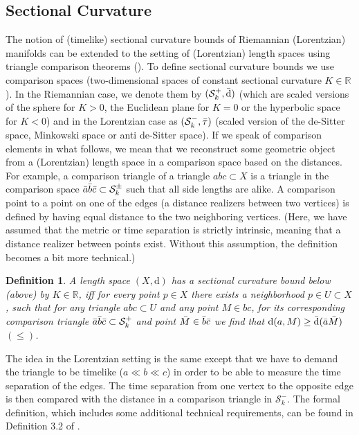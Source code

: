 \documentclass[11pt, a4paper]{article} %
\newcommand{\R}{\mathbb{R}} %
\newcommand{\dd}{\text{d}} %
\newtheorem{definition}{Definition}[section]
\theoremstyle{plain} %
\begin{document}
\subsection{Sectional Curvature}
The notion of (timelike) sectional curvature bounds of Riemannian (Lorentzian) manifolds can be extended to the setting of (Lorentzian) length spaces using triangle comparison theorems \cite{Burago2001} (\cite{beran2023curvature}). 
To define sectional curvature bounds we use comparison spaces (two-dimensional spaces of constant sectional curvature $K\in \R$). In the Riemannian case, we denote them by $(\mathcal{S}^+_k,\Bar{\dd})$ (which are scaled versions of the sphere for $K>0$, the Euclidean plane for $K=0$ or the hyperbolic space for $K<0$) and in the Lorentzian case as $(\mathcal{S}^-_k,\Bar{\tau})$ (scaled version of the de-Sitter space, Minkowski space or anti de-Sitter space).
If we speak of comparison elements in what follows, we mean that we reconstruct some geometric object from a (Lorentzian) length space in a comparison space based on the distances. For example, a comparison triangle of a triangle $abc \subset X$ is a triangle in the comparison space $\Bar{a}\Bar{b}\Bar{c}\subset \mathcal{S}^\pm_k$ such that all side lengths are alike. A comparison point to a point on one of the edges (a distance realizers between two vertices) is defined by having equal distance to the two neighboring vertices. (Here, we have assumed that the metric or time separation is strictly intrinsic, meaning that a distance realizer between points exist. Without this assumption, the definition becomes a bit more technical.)
\begin{definition}
A length space $(X,\dd)$ has a sectional curvature bound below (above) by $K\in\R$, iff for every point $p\in X$ there exists a neighborhood $p \in U \subset X$, such that for any triangle $abc \subset U$ and any point $M \in bc$, for its corresponding comparison triangle $\Bar{a}\Bar{b}\Bar{c}\subset \mathcal{S}^+_k$ and point $\Bar{M}\in \Bar{b}\Bar{c}$ we find that $\dd(a,M) \geq \Bar{\dd}(\Bar{a}\Bar{M})$ $(\leq)$.
\end{definition}
The idea in the Lorentzian setting is the same except that we have to demand the triangle to be timelike ($a\ll b\ll c$) in order to be able to measure the time separation of the edges. The time separation from one vertex to the opposite edge is then compared with the distance in a comparison triangle in $\mathcal{S}^-_k$. The formal definition, which includes some additional technical requirements, can be found in Definition 3.2 of \cite{beran2023curvature}.
\end{document}
